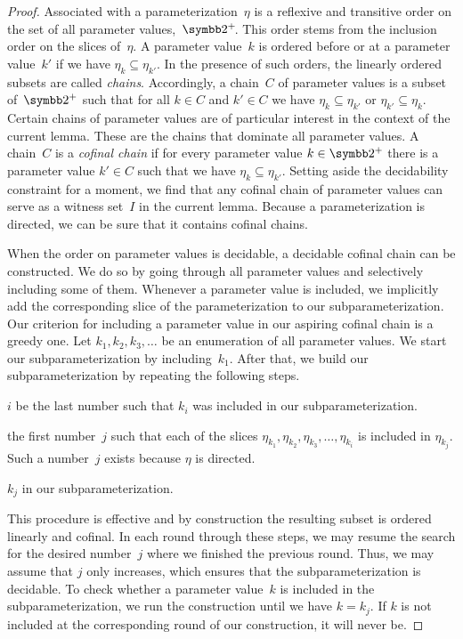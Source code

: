 \begin{proof}
  Associated with a parameterization~$\eta$ is a reflexive and transitive order on the set of all parameter values,~$\binary^+\!$.
  This order stems from the inclusion order on the slices of~$\eta$.
  A parameter value~$k$ is ordered before or at a parameter value~$k'$ if we have $\eta_k \subseteq \eta_{k'}$.
  In the presence of such orders, the linearly ordered subsets are called \emph{chains}.
  Accordingly, a chain~$C$ of parameter values is a subset of~$\binary^+$ such that for all $k \in C$ and $k' \in C$ we have $\eta_k \subseteq \eta_{k'}$ or $\eta_{k'} \subseteq \eta_k$.
  Certain chains of parameter values are of particular interest in the context of the current lemma.
  These are the chains that dominate all parameter values.
  A chain~$C$ is a \emph{cofinal chain} \parencite{abramsky1994domain} if for every parameter value $k \in \binary^+$ there is a parameter value $k' \in C$ such that we have $\eta_{k} \subseteq \eta_{k'}$.
  Setting aside the decidability constraint for a moment, we find that any cofinal chain of parameter values can serve as a witness set~$I$ in the current lemma.
  Because a parameterization is directed, we can be sure that it contains cofinal chains.

  When the order on parameter values is decidable, a decidable cofinal chain can be constructed.
  We do so by going through all parameter values and selectively including some of them.
  Whenever a parameter value is included, we implicitly add the corresponding slice of the parameterization to our subparameterization.
  Our criterion for including a parameter value in our aspiring cofinal chain is a greedy one.
  Let $k_1, k_2, k_3, \ldots$ be an enumeration of all parameter values.
  We start our subparameterization by including~$k_1$.
  After that, we build our subparameterization by repeating the following steps.
  \begin{codelisting}
  \item
     $i$ be the last number such that $k_i$ was included in our subparameterization.
  \item
     the first number~$j$ such that each of the slices $\eta_{k_1}, \eta_{k_2}, \eta_{k_3}, \ldots, \eta_{k_i}$ is included in $\eta_{k_j}$.
    Such a number~$j$ exists because $\eta$ is directed.
  \item
     $k_j$ in our subparameterization.
  \end{codelisting}
  This procedure is effective and by construction the resulting subset is ordered linearly and cofinal.
  In each round through these steps, we may resume the search for the desired number~$j$ where we finished the previous round.
  Thus, we may assume that $j$ only increases, which ensures that the subparameterization is decidable.
  To check whether a parameter value~$k$ is included in the subparameterization, we run the construction until we have $k = k_j$.
  If $k$ is not included at the corresponding round of our construction, it will never be.
\end{proof}

